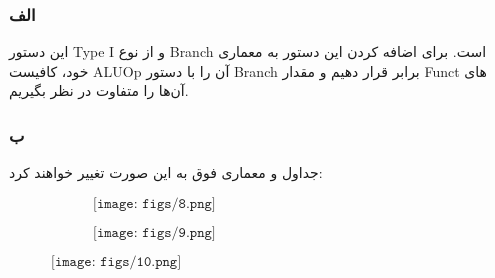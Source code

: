 \subsubsection*{الف}
این دستور Type I و از نوع Branch است. برای اضافه کردن این دستور به معماری خود، کافیست ALUOp آن را با دستور Branch برابر قرار دهیم و مقدار Funct های آن‌ها را متفاوت در نظر بگیریم.
\subsubsection*{ب}
جداول و معماری فوق به این صورت تغییر خواهند کرد:
\setLTR

$\qquad\quad\quad\quad\quad\texttt{[image: figs/8.png]}$

\setRTL

\setLTR

$\qquad\quad\quad\quad\quad\texttt{[image: figs/9.png]}$ 

\setRTL 

\setLTR

$\quad\qquad\texttt{[image: figs/10.png]}$

\setRTL